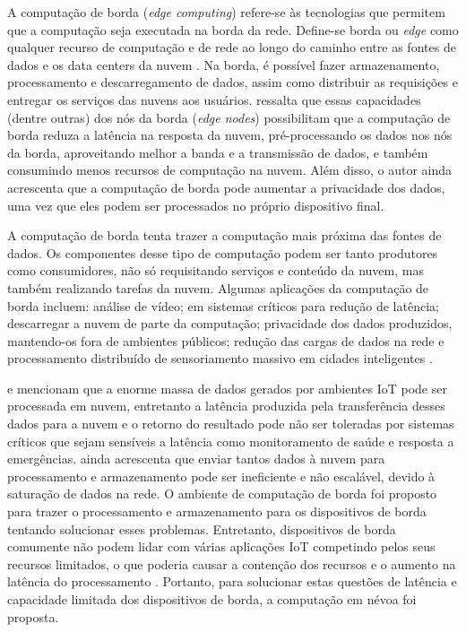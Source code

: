 
A computação de borda (\emph{edge computing}) refere-se às
tecnologias que permitem que a computação seja executada na borda da rede.
Define-se borda ou \emph{edge} como qualquer recurso de computação e de rede ao
longo do caminho entre as fontes de dados e os data centers da nuvem
\cite{Shi2016}.
Na borda, é possível fazer armazenamento, processamento e descarregamento de
dados, assim como distribuir as requisições e entregar os serviços das nuvens
aos usuários.
 ressalta que essas capacidades (dentre outras) dos nós da
borda (\emph{edge nodes}) possibilitam que a computação de borda reduza a
latência na resposta da nuvem, pré-processando os dados nos nós da borda,
aproveitando melhor a banda e a transmissão de dados, e também consumindo menos
recursos de computação na nuvem.
Além disso, o autor ainda acrescenta que a computação de borda pode aumentar a
privacidade dos dados, uma vez que eles podem ser processados no próprio
dispositivo final.

A computação de borda tenta trazer a computação mais próxima das fontes de
dados.
Os componentes desse tipo de computação podem ser
tanto produtores como consumidores, não só requisitando serviços e conteúdo da
nuvem, mas também realizando tarefas da nuvem.
Algumas aplicações da computação de borda incluem: análise de vídeo;
em sistemas críticos para redução de latência;
descarregar a nuvem de parte da computação;
privacidade dos dados produzidos, mantendo-os fora de ambientes públicos;
redução das cargas de dados na rede e
processamento distribuído de sensoriamento massivo em cidades inteligentes \cite{Shi2016}.


 e 
mencionam que a enorme massa de dados gerados por ambientes IoT pode ser
processada em nuvem, entretanto a latência produzida pela transferência desses
dados para a nuvem e o retorno do resultado pode não ser toleradas por sistemas
críticos que sejam sensíveis a latência como monitoramento de saúde e resposta a
emergências.
 ainda acrescenta que enviar tantos
dados à nuvem
para processamento e armazenamento pode ser ineficiente e não escalável, devido à
saturação de dados na rede.
O ambiente de computação de borda foi proposto para trazer o
processamento e armazenamento para os dispositivos de borda tentando solucionar
esses problemas.
Entretanto, dispositivos de borda comumente não podem lidar com várias
aplicações IoT competindo pelos seus recursos limitados, o que poderia causar a
contenção dos recursos e o aumento na latência do processamento
\cite{Dastjerdi2016}. Portanto, para solucionar estas questões de latência e
capacidade limitada dos dispositivos de borda, a computação em névoa foi proposta.

